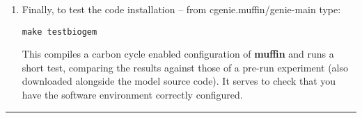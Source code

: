 \documentclass[10pt,twoside]{article}
\begin{document}
\begin{enumerate}[noitemsep]
\begin{itemize}
\end{itemize}

\vspace{1mm}
\item Finally, to test the code installation – from \textsf{cgenie.muffin/genie-main} type:
\vspace{-2pt}
\begin{verbatim}
make testbiogem
\end{verbatim}
\vspace{-2pt}
This compiles a carbon cycle enabled configuration of \textbf{muffin} and runs a short test, comparing the results against those of a pre-run experiment (also downloaded alongside the model source code). It serves to check that you have the software environment correctly configured. 

\end{enumerate}

\vspace{1mm}\noindent\rule{4cm}{0.2mm}

\end{document}
